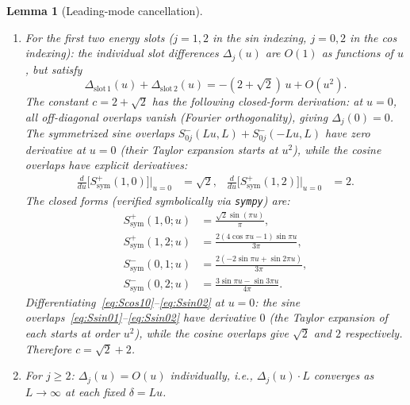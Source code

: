 \documentclass[12pt,a4paper]{article}
\newtheorem{lemma}[theorem]{Lemma}
\theoremstyle{definition}
\theoremstyle{remark}
\begin{document}
\begin{lemma}[Leading-mode cancellation]
\label{lem:leading-cancel}
\begin{enumerate}[label=\textup{(\alph*)}]
  \item For the first two energy slots ($j = 1, 2$ in the sin indexing, $j = 0, 2$ in the cos indexing): the individual slot differences $\Delta_j(u)$ are $O(1)$ as functions of $u$, but satisfy
  \begin{equation}
  \label{eq:pairwise-cancel}
    \Delta_{\mathrm{slot\,1}}(u) + \Delta_{\mathrm{slot\,2}}(u) = -(2 + \sqrt{2})\,u + O(u^2).
  \end{equation}
  The constant $c = 2 + \sqrt{2}$ has the following closed-form derivation: at $u = 0$, all off-diagonal overlaps vanish (Fourier orthogonality), giving $\Delta_j(0) = 0$. The symmetrized sine overlaps $S^-_{0j}(Lu, L) + S^-_{0j}(-Lu, L)$ have \emph{zero derivative} at $u = 0$ (their Taylor expansion starts at $u^2$), while the cosine overlaps have explicit derivatives:
  \begin{align*}
    \frac{d}{du}\bigl[S^+_{\mathrm{sym}}(1, 0)\bigr]\Big|_{u=0} &= \sqrt{2}, &
    \frac{d}{du}\bigl[S^+_{\mathrm{sym}}(1, 2)\bigr]\Big|_{u=0} &= 2.
  \end{align*}
  The closed forms (verified symbolically via \texttt{sympy}) are:
  \begin{align}
    S^+_{\mathrm{sym}}(1,0;u) &= \frac{\sqrt{2}\sin(\pi u)}{\pi}, \label{eq:Scos10} \\
    S^+_{\mathrm{sym}}(1,2;u) &= \frac{2(4\cos\pi u - 1)\sin\pi u}{3\pi}, \label{eq:Scos12} \\
    S^-_{\mathrm{sym}}(0,1;u) &= \frac{2(-2\sin\pi u + \sin 2\pi u)}{3\pi}, \label{eq:Ssin01} \\
    S^-_{\mathrm{sym}}(0,2;u) &= \frac{3\sin\pi u - \sin 3\pi u}{4\pi}. \label{eq:Ssin02}
  \end{align}
  Differentiating~\eqref{eq:Scos10}--\eqref{eq:Ssin02} at $u = 0$: the sine overlaps~\eqref{eq:Ssin01}--\eqref{eq:Ssin02} have derivative $0$ (the Taylor expansion of each starts at order $u^2$), while the cosine overlaps give $\sqrt{2}$ and $2$ respectively. Therefore $c = \sqrt{2} + 2$.
  \item For $j \geq 2$: $\Delta_j(u) = O(u)$ individually, i.e., $\Delta_j(u) \cdot L$ converges as $L \to \infty$ at each fixed $\delta = Lu$.
\end{enumerate}
\end{lemma}
\end{document}
